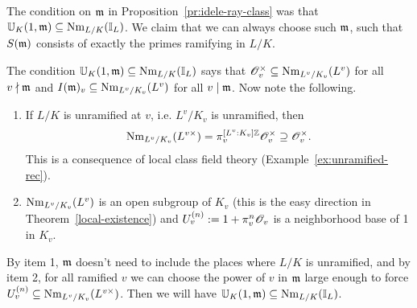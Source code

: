 \begin{rem}
The condition on $\mathfrak{m}$ in Proposition~\ref{pr:idele-ray-class} was that $\mathbb U_K(1,\mathfrak{m})\subseteq \operatorname{Nm}_{L/K}(\mathbb{I}_L)$. We claim that we can always choose such $\mathfrak{m}$, such that $S(\mathfrak{m})$ consists of exactly the primes ramifying in $L/K$.

The condition $\mathbb U_K(1,\mathfrak{m})\subseteq \operatorname{Nm}_{L/K}(\mathbb{I}_L)$ says that $\mathscr{O}_v^{\times}\subseteq \operatorname{Nm}_{L^v/K_v}(L^v)$ for all $v\nmid \mathfrak{m}$ and 
$I(\mathfrak{m})_v\subseteq \operatorname{Nm}_{L^v/K_v}(L^v)$ for all $v\mid \mathfrak{m}$. Now note the following.
\begin{enumerate}
\item If $L/K$ is unramified at $v$, i.e. $L^v/K_v$ is unramified, then
\[
\operatorname{Nm}_{L^v/K_v}(L^{v\times})=\pi_v^{[L^v:K_v]\mathbb{Z}}\mathscr{O}_v^{\times}\supseteq \mathscr{O}_v^{\times}.
\]
This is a consequence of local class field theory (Example~\ref{ex:unramified-rec}).
\item $\operatorname{Nm}_{L^v/K_v}(L^v)$ is an open subgroup of $K_v$ (this is the easy direction in Theorem~\ref{local-existence}) and $U_v^{(n)}:=1+\pi_v^n\mathscr{O}_v$ is a neighborhood base of 1 in $K_v$.
\end{enumerate}
By item 1, $\mathfrak{m}$ doesn't need to include the places where $L/K$ is unramified, and by item 2, for all ramified $v$ we can choose the power of $v$ in $\mathfrak{m}$ large enough to force $U_v^{(n)}\subseteq \operatorname{Nm}_{L^v/K_v}(L^{v\times})$. Then we will have $\mathbb U_K(1,\mathfrak{m})\subseteq \operatorname{Nm}_{L/K}(\mathbb{I}_L)$.
\end{rem}
